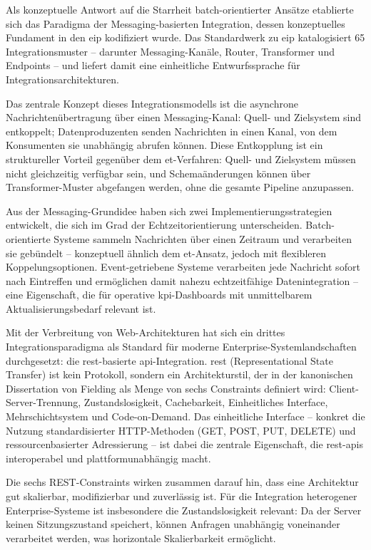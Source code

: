 Als konzeptuelle Antwort auf die Starrheit batch-orientierter Ansätze etablierte sich das Paradigma der Messaging-basierten Integration, dessen konzeptuelles Fundament in den \gls{eip} kodifiziert wurde.
Das Standardwerk zu \gls{eip} katalogisiert 65 Integrationsmuster -- darunter Messaging-Kanäle, Router, Transformer und Endpoints -- und liefert damit eine einheitliche Entwurfssprache für Integrationsarchitekturen.

Das zentrale Konzept dieses Integrationsmodells ist die asynchrone Nachrichtenübertragung über einen Messaging-Kanal: Quell- und Zielsystem sind entkoppelt; Datenproduzenten senden Nachrichten in einen Kanal, von dem Konsumenten sie unabhängig abrufen können.
Diese Entkopplung ist ein struktureller Vorteil gegenüber dem \gls{et}-Verfahren: Quell- und Zielsystem müssen nicht gleichzeitig verfügbar sein, und Schemaänderungen können über Transformer-Muster abgefangen werden, ohne die gesamte Pipeline anzupassen.

Aus der Messaging-Grundidee haben sich zwei Implementierungsstrategien entwickelt, die sich im Grad der Echtzeitorientierung unterscheiden.
Batch-orientierte Systeme sammeln Nachrichten über einen Zeitraum und verarbeiten sie gebündelt -- konzeptuell ähnlich dem \gls{et}-Ansatz, jedoch mit flexibleren Koppelungsoptionen.
Event-getriebene Systeme verarbeiten jede Nachricht sofort nach Eintreffen und ermöglichen damit nahezu echtzeitfähige Datenintegration -- eine Eigenschaft, die für operative \gls{kpi}-Dashboards mit unmittelbarem Aktualisierungsbedarf relevant ist.

Mit der Verbreitung von Web-Architekturen hat sich ein drittes Integrationsparadigma als Standard für moderne Enterprise-Systemlandschaften durchgesetzt: die \gls{rest}-basierte \gls{api}-Integration.
\gls{rest} (Representational State Transfer) ist kein Protokoll, sondern ein Architekturstil, der in der kanonischen Dissertation von Fielding als Menge von sechs Constraints definiert wird: Client-Server-Trennung, Zustandslosigkeit, Cachebarkeit, Einheitliches Interface, Mehrschichtsystem und Code-on-Demand.
Das einheitliche Interface -- konkret die Nutzung standardisierter HTTP-Methoden (GET, POST, PUT, DELETE) und ressourcenbasierter Adressierung -- ist dabei die zentrale Eigenschaft, die \gls{rest}-\glspl{api} interoperabel und plattformunabhängig macht.

Die sechs REST-Constraints wirken zusammen darauf hin, dass eine Architektur gut skalierbar, modifizierbar und zuverlässig ist.
Für die Integration heterogener Enterprise-Systeme ist insbesondere die Zustandslosigkeit relevant: Da der Server keinen Sitzungszustand speichert, können Anfragen unabhängig voneinander verarbeitet werden, was horizontale Skalierbarkeit ermöglicht.

